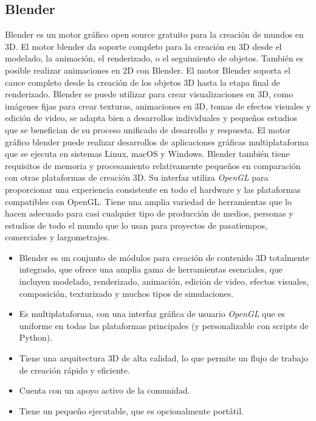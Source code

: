 \documentclass[a4paper]{book}
\begin{document}
\subsection{Blender}
\label{subsec:Blender}

Blender es un motor gráfico open source gratuito para la creación de mundos en 3D. El motor blender da soporte completo
para la creación en 3D desde el modelado, la animación, el renderizado, o el seguimiento de objetos. También es posible
realizar animaciones en 2D con Blender. El motor Blender soporta el cauce completo desde la creación de los objetos 3D
hasta la etapa final de renderizado. Blender se puede utilizar para crear visualizaciones en 3D, como imágenes fijas para
crear texturas, animaciones en 3D, tomas de efectos visuales y edición de video, se adapta bien a desarrollos individuales
y pequeños estudios que se benefician de su proceso unificado de desarrollo y respuesta. El motor gráfico blender puede realizar
desarrollos de aplicaciones gráficas multiplataforma que se ejecuta en sistemas Linux, macOS y Windows. Blender también tiene requisitos
de memoria y procesamiento relativamente pequeños en comparación con otras plataformas de creación 3D. Su interfaz utiliza \textit{OpenGL}
para proporcionar una experiencia consistente en todo el hardware y las plataformas compatibles con OpenGL. Tiene una amplia variedad de
herramientas que lo hacen adecuado para casi cualquier tipo de producción de medios, personas y estudios de todo el mundo que lo
usan para proyectos de pasatiempos, comerciales y largometrajes. \cite{blender:_manual}

\begin{itemize}
  \item Blender es un conjunto de módulos para creación de contenido 3D totalmente integrado, que ofrece una amplia gama de
  herramientas esenciales, que incluyen modelado, renderizado, animación, edición de video, efectos visuales, composición,
  texturizado y muchos tipos de simulaciones.

  \item Es multiplataforma, con una interfaz gráfica de usuario \textit{OpenGL} que es uniforme en todas las plataformas principales
  (y personalizable con scripts de Python).

  \item Tiene una arquitectura 3D de alta calidad, lo que permite un flujo de trabajo de creación rápido y eficiente.

  \item Cuenta con un apoyo activo de la comunidad.

  \item Tiene un pequeño ejecutable, que es opcionalmente portátil.
\end{itemize}
\end{document}
